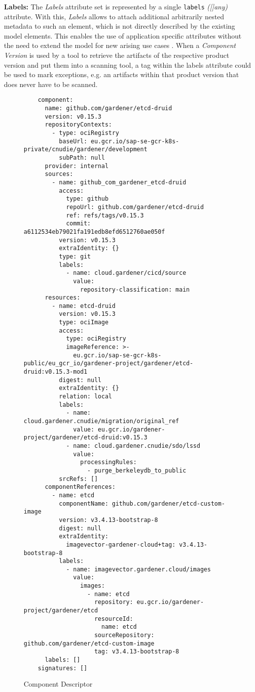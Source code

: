 \textbf{Labels:} The \emph{Labels} attribute set is represented by a single \lstinline|labels| \emph{([]any)} attribute. With this, \emph{Labels} allows to attach additional arbitrarily nested metadata to such an element, which is not directly described by the existing model elements. This enables the use of application specific attributes without the need to extend the model for new arising use cases \cite{OCMSpec}. When a \emph{Component Version} is used by a tool to retrieve the artifacts of the respective product version and put them into a scanning tool, a tag within the labels attribute could be used to mark exceptions, e.g. an artifacts within that product version that does never have to be scanned.
\begin{figure}[H]
\begin{verbatim}
    component:
      name: github.com/gardener/etcd-druid
      version: v0.15.3
      repositoryContexts:
        - type: ociRegistry
          baseUrl: eu.gcr.io/sap-se-gcr-k8s-private/cnudie/gardener/development
          subPath: null
      provider: internal
      sources:
        - name: github_com_gardener_etcd-druid
          access:
            type: github
            repoUrl: github.com/gardener/etcd-druid
            ref: refs/tags/v0.15.3
            commit: a6112534eb79021fa191edb8efd6512760ae050f
          version: v0.15.3
          extraIdentity: {}
          type: git
          labels:
            - name: cloud.gardener/cicd/source
              value:
                repository-classification: main
      resources:
        - name: etcd-druid
          version: v0.15.3
          type: ociImage
          access:
            type: ociRegistry
            imageReference: >-
              eu.gcr.io/sap-se-gcr-k8s-public/eu_gcr_io/gardener-project/gardener/etcd-druid:v0.15.3-mod1
          digest: null
          extraIdentity: {}
          relation: local
          labels:
            - name: cloud.gardener.cnudie/migration/original_ref
              value: eu.gcr.io/gardener-project/gardener/etcd-druid:v0.15.3
            - name: cloud.gardener.cnudie/sdo/lssd
              value:
                processingRules:
                  - purge_berkeleydb_to_public
          srcRefs: []
      componentReferences:
        - name: etcd
          componentName: github.com/gardener/etcd-custom-image
          version: v3.4.13-bootstrap-8
          digest: null
          extraIdentity:
            imagevector-gardener-cloud+tag: v3.4.13-bootstrap-8
          labels:
            - name: imagevector.gardener.cloud/images
              value:
                images:
                  - name: etcd
                    repository: eu.gcr.io/gardener-project/gardener/etcd
                    resourceId:
                      name: etcd
                    sourceRepository: github.com/gardener/etcd-custom-image
                    tag: v3.4.13-bootstrap-8
      labels: []
    signatures: []
\end{verbatim}
	\centering
	\caption[Component Descriptor]{Component Descriptor }
	\label{fig:ComponentDescriptor}
\end{figure}

